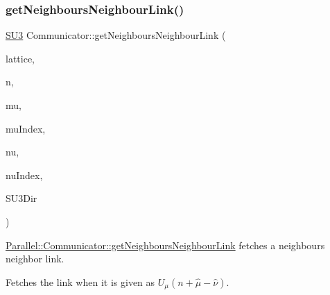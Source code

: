 \subsubsection{\texorpdfstring{getNeighboursNeighbourLink()}{getNeighboursNeighbourLink()}}
{\footnotesize\ttfamily \mbox{\hyperlink{class_s_u3}{S\+U3}} Communicator\+::get\+Neighbours\+Neighbour\+Link (\begin{DoxyParamCaption}\item[{\mbox{\hyperlink{class_lattice}{Lattice}}$<$ \mbox{\hyperlink{class_s_u3}{S\+U3}} $>$ $\ast$}]{lattice,  }\item[{std\+::vector$<$ int $>$}]{n,  }\item[{int}]{mu,  }\item[{int $\ast$}]{mu\+Index,  }\item[{int}]{nu,  }\item[{int $\ast$}]{nu\+Index,  }\item[{int}]{S\+U3\+Dir }\end{DoxyParamCaption})\hspace{0.3cm}{\ttfamily [static]}}



\mbox{\hyperlink{class_parallel_1_1_communicator_a27862560cf6c7b8ccf650a422e014776}{Parallel\+::\+Communicator\+::get\+Neighbours\+Neighbour\+Link}} fetches a neighbours neighbor link. 

Fetches the link when it is given as $U_\mu(n + \hat{\mu} - \hat{\nu})$.


